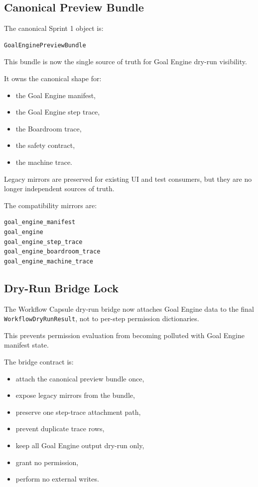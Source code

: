 \subsection{Canonical Preview Bundle}

The canonical Sprint 1 object is:

\begin{verbatim}
GoalEnginePreviewBundle
\end{verbatim}

This bundle is now the single source of truth for Goal Engine dry-run visibility.

It owns the canonical shape for:

\begin{itemize}
  \item the Goal Engine manifest,
  \item the Goal Engine step trace,
  \item the Boardroom trace,
  \item the safety contract,
  \item the machine trace.
\end{itemize}

Legacy mirrors are preserved for existing UI and test consumers, but they are no longer independent sources of truth.

The compatibility mirrors are:

\begin{verbatim}
goal_engine_manifest
goal_engine
goal_engine_step_trace
goal_engine_boardroom_trace
goal_engine_machine_trace
\end{verbatim}

\subsection{Dry-Run Bridge Lock}

The Workflow Capsule dry-run bridge now attaches Goal Engine data to the final \texttt{WorkflowDryRunResult}, not to per-step permission dictionaries.

This prevents permission evaluation from becoming polluted with Goal Engine manifest state.

The bridge contract is:

\begin{itemize}
  \item attach the canonical preview bundle once,
  \item expose legacy mirrors from the bundle,
  \item preserve one step-trace attachment path,
  \item prevent duplicate trace rows,
  \item keep all Goal Engine output dry-run only,
  \item grant no permission,
  \item perform no external writes.
\end{itemize}

